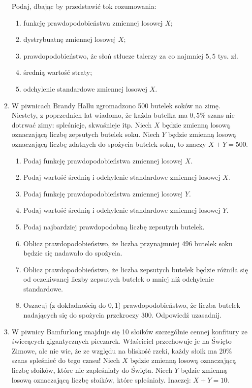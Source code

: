 \documentclass{mwart}
\begin{document}
\begin{enumerate}
Podaj, dbając by przedstawić tok rozumowania:
\begin{enumerate}
\item funkcję prawdopodobieństwa zmiennej losowej $X$;
\item dystrybuatnę zmiennej losowej $X$;
\item prawdopodobieństwo, że słoń stłucze talerzy za co najmniej $5{,}5$ tys. zł.
\item średnią wartość straty;
\item odchylenie standardowe zmiennej losowej $X$.
\end{enumerate}
\newpage
\item W piwnicach Brandy Hallu zgromadzono 500 butelek soków na zimę.
Niestety, z poprzednich lat wiadomo, że każda butelka ma $0{,}5\%$ szans nie dotrwać zimy: spleśnieje, skwaśnieje itp.
Niech $X$ będzie zmienną losową oznaczającą liczbę zepsutych butelek soku.
Niech $Y$ będzie zmienną losową oznaczającą liczbę zdatnych do spożycia butelek soku, to znaczy $X+Y=500$.

\begin{enumerate}
\item Podaj funkcję prawdopodobieństwa zmiennej losowej $X$.
\item Podaj wartość średnią i odchylenie standardowe zmiennej losowej $X$.
\item Podaj funkcję prawdopodobieństwa zmiennej losowej $Y$.
\item Podaj wartość średnią i odchylenie standardowe zmiennej losowej $Y$.
\item Podaj najbardziej prawdopodobną liczbę zepsutych butelek.
\item Oblicz prawdopodobieństwo, że liczba przynajmniej 496 butelek soku będzie się nadawało do spożycia.
\item Oblicz prawdopodobieństwo, że liczba zepsutych butelek będzie różniła się od oczekiwanej liczby zepsutych butelek o mniej niż odchylenie standardowe.
\item Oszacuj (z dokładnością do $0{,}1$) prawdopodobieństwo, że liczba butelek nadających się do spożycia przekroczy 300. Odpowiedź uzasadnij.
\end{enumerate}
\item W piwnicy Bamfurlong znajduje się 10 słoików szczególnie cennej konfitury ze świecących gigantycznych pieczarek.
Właściciel przechowuje je na Święto Zimowe, ale nie wie, że ze względu na bliskość rzeki, każdy słoik ma 20\% szans spleśnieć do tego czasu!
Niech $X$ będzie zmienną losową oznaczającą liczbę słoików, które nie zapleśniały do Święta.
Niech $Y$ będzie zmienną losową oznaczającą liczbę słoików, które spleśniały.
Inaczej: $X+Y=10$.


\end{enumerate}
\end{document}
